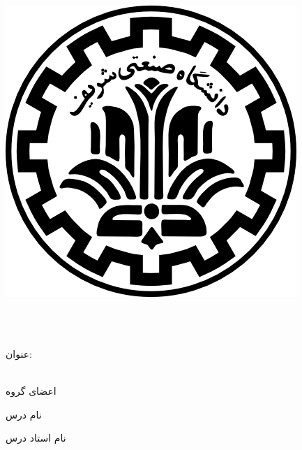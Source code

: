 
\begin{center}

\includegraphics[scale=0.2]{front/template/images/logo.png}

\vspace{-0.2cm}
\University \\[-0.3em]
\Department\\


\begin{large}
\vspace{0.5cm}



\end{large}

\vspace{1.5cm}

{عنوان:}\\[1.2em]
{\LARGE\textbf{\CourseReportTitle}}\\ 
\vspace{1cm}
\begin{latin}
{\Large\textbf\EnglishCourseTitle}
\end{latin}

\vspace{2cm}
{اعضای گروه}\\[.5em]
{\large\textbf{\GroupeMembers}}

\vspace{0.7cm}

{نام درس}\\[.5em]
{\large\textbf{\CourseName}}
\vspace{0.7cm}

{\large\textbf{\courseSemester}}

{نام استاد درس}\\[.5em]
{\large\textbf{\CourseProfessor}}

\vspace{1.2cm}

\end{center}

\newpage
